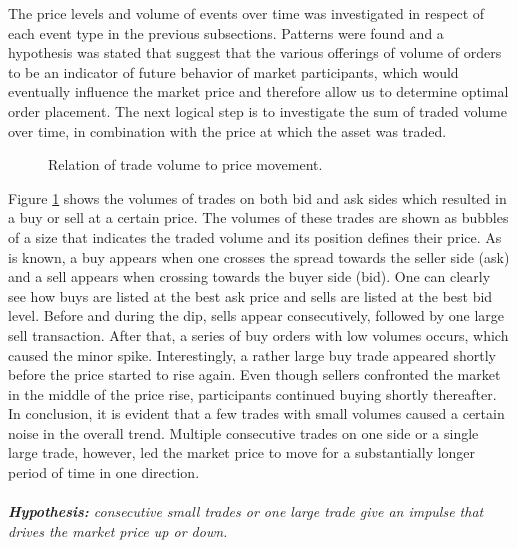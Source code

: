 The price levels and volume of events over time was investigated in respect of each event type in the previous subsections.
Patterns were found and a hypothesis was stated that suggest that the various offerings of volume of orders to be an indicator of future behavior of market participants, which would eventually influence the market price and therefore allow us to determine optimal order placement.
The next logical step is to investigate the sum of traded volume over time, in combination with the price at which the asset was traded.
\begin{figure}[H]
    \centering
    \caption{Relation of trade volume to price movement.}
    \label{fig:data-trade-volume}
\end{figure}
Figure \ref{fig:data-trade-volume} shows the volumes of trades on both bid and ask sides which resulted in a buy or sell at a certain price.
The volumes of these trades are shown as bubbles of a size that indicates the traded volume and its position defines their price.
As is known, a buy appears when one crosses the spread towards the seller side (ask) and a sell appears when crossing towards the buyer side (bid).
One can clearly see how buys are listed at the best ask price and sells are listed at the best bid level.
Before and during the dip, sells appear consecutively, followed by one large sell transaction.
After that, a series of buy orders with low volumes occurs, which caused the minor spike.
Interestingly, a rather large buy trade appeared shortly before the price started to rise again.
Even though sellers confronted the market in the middle of the price rise, participants continued buying shortly thereafter.
In conclusion, it is evident that a few trades with small volumes caused a certain noise in the overall trend.
Multiple consecutive trades on one side or a single large trade, however, led the market price to move for a substantially longer period of time in one direction.
\\
\\
\textit{\textbf{Hypothesis:} consecutive small trades or one large trade give an impulse that drives the market price up or down.}


